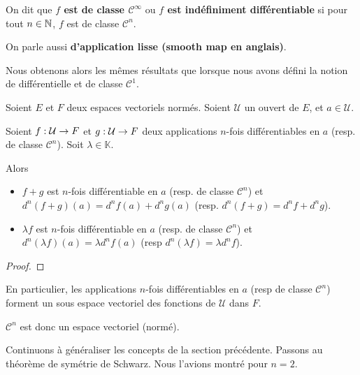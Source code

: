 \begin{definition}
	On dit que \textbf{$f$ est de classe $\mathcal{C}^{\infty}$} ou \textbf{$f$
	est indéfiniment différentiable} si pour tout $n \in
	\mathbb{N}$, $f$ est de classe $\mathcal{C}^{n}$.

	On parle aussi \textbf{d'application lisse (smooth map en anglais)}.
\end{definition}

Nous obtenons alors les mêmes résultats que lorsque nous avons défini la notion
de différentielle et de classe $\mathcal{C}^{1}$.

\begin{proposition} [Linéarité]
	Soient $E$ et $F$ deux espaces vectoriels normés. Soient $\mathcal{U}$ un ouvert de $E$,
	et $a \in \mathcal{U}$.

	Soient $f : \mathcal{U} \rightarrow F$ et $g : \mathcal{U} \rightarrow F$
	deux applications $n$-fois différentiables en $a$ (resp. de classe $\mathcal{C}^{n}$).
	Soit $\lambda \in \mathbb{K}$.

	Alors

	\begin{itemize}
		\item $f + g$ est $n$-fois différentiable en $a$ (resp. de classe
			$\mathcal{C}^{n}$) et $d^{n}(f + g) (a) = d^{n}f(a) + d^{n}g(a)$
			(resp. $d^{n} (f + g) = d^{n} f + d^{n} g$).
		\item $\lambda f$ est $n$-fois différentiable en $a$ (resp. de classe
			$\mathcal{C}^{n}$) et $d^{n} (\lambda f) (a) = \lambda d^{n} f (a)$
			(resp $d^{n} (\lambda f) = \lambda d^{n} f$).
	\end{itemize}
\end{proposition}

\ifdefined\outputproof
\begin{proof}

\end{proof}
\fi

\begin{remarque}
	En particulier, les applications $n$-fois différentiables en $a$ (resp de
	classe $\mathcal{C}^{n}$) forment un sous espace vectoriel des fonctions de
	$\mathcal{U}$ dans $F$.

	$\mathcal{C}^{n}$ est donc un espace vectoriel (normé).
\end{remarque}

Continuons à généraliser les concepts de la section précédente. Passons au
théorème de symétrie de Schwarz. Nous l'avions montré pour $n = 2$.

